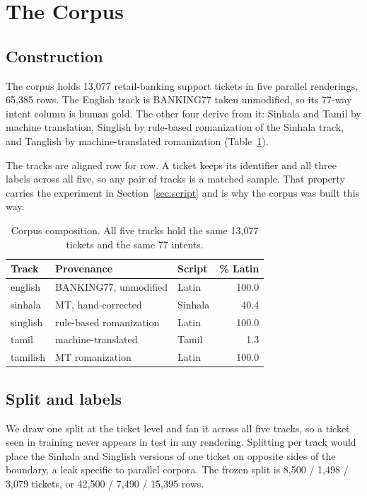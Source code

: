 \section{The Corpus}
\label{sec:corpus}

\subsection{Construction}

The corpus holds 13{,}077 retail-banking support tickets in five parallel
renderings, 65{,}385 rows. The English track is BANKING77
\cite{casanueva2020banking77} taken unmodified, so its 77-way intent column is
human gold. The other four derive from it: Sinhala and Tamil by machine
translation, Singlish by rule-based romanization of the Sinhala track, and
Tanglish by machine-translated romanization (Table~\ref{tab:composition}).

The tracks are aligned row for row. A ticket keeps its identifier and all three
labels across all five, so any pair of tracks is a matched sample. That property
carries the experiment in Section~\ref{sec:script} and is why the corpus was
built this way.

\begin{table}[t]
\caption{Corpus composition. All five tracks hold the same 13{,}077 tickets and
the same 77 intents.}
\label{tab:composition}
\centering
\small
\begin{tabular}{lllr}
\toprule
Track & Provenance & Script & \% Latin \\
\midrule
english  & BANKING77, unmodified   & Latin   & 100.0 \\
sinhala  & MT, hand-corrected      & Sinhala & 40.4 \\
singlish & rule-based romanization & Latin   & 100.0 \\
tamil    & machine-translated      & Tamil   & 1.3 \\
tamilish & MT romanization         & Latin   & 100.0 \\
\bottomrule
\end{tabular}
\end{table}

\subsection{Split and labels}

We draw one split at the ticket level and fan it across all five tracks, so a
ticket seen in training never appears in test in any rendering. Splitting per
track would place the Sinhala and Singlish versions of one ticket on opposite
sides of the boundary, a leak specific to parallel corpora. The frozen split is
8{,}500 / 1{,}498 / 3{,}079 tickets, or 42{,}500 / 7{,}490 / 15{,}395 rows.

